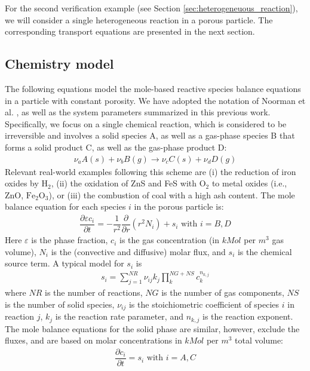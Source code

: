 \documentclass{particles2015}
\begin{document}
For the second verification example (see Section \ref{sec:heterogeneuous_reaction}), we will consider a single heterogeneous reaction in a porous particle. The corresponding transport equations are presented in the next section.

\subsection{Chemistry model}
The following equations model the mole-based reactive species balance equations in a particle with constant porosity. We have adopted the notation of Noorman et al. \cite{Noorman2011}, as well as the system parameters summarized in this previous work. Specifically, we focus on a single chemical reaction, which is considered to be irreversible and involves a solid species A, as well as a gas-phase species B that forms a solid product C, as well as the gas-phase product D:
\begin{align}
\nu_a A (s) + \nu_b B (g) \rightarrow \nu_c C(s) + \nu_d D(g)
\end{align}
Relevant real-world examples following this scheme are (i) the reduction of iron oxides by $\text{H}_2$, (ii) the oxidation of ZnS and FeS with $\text{O}_2$ to metal oxides (i.e., ZnO, $\text{Fe}_2\text{O}_3$), or (iii) the combustion of coal with a high ash content. The mole balance equation for each species $i$ in the porous particle is:
\begin{align}
\dfrac{\partial \varepsilon c_i}{\partial t} = - \dfrac{1}{r^2} \dfrac{\partial}{\partial r } (r^2 N_i) + s_i \text{ with } i = B, D
\end{align}
Here $\varepsilon$ is the phase fraction, $c_i$ is the gas concentration (in $kMol$ per $m^3$ gas volume), $N_i$ is the (convective and diffusive) molar flux, and $s_i$ is the chemical source term. A typical model for $s_i$ is
\begin{align}
s_i = \sum\limits_{j=1}^{NR} \nu_{ij} k_j \prod\limits_k^{NG+NS} c_k^{n_{k,j}}
\end{align} 
where $NR$ is the number of reactions, $NG$ is the number of gas components, $NS$ is the number of solid species, $\nu_{ij}$ is the stoichiometric coefficient of species $i$ in reaction $j$, $k_j$ is the reaction rate parameter, and $n_{k,j}$ is the reaction exponent. The mole balance equations for the solid phase are similar, however, exclude the fluxes, and are based on molar concentrations in $kMol$ per $m^3$ total volume:
\begin{align}
\dfrac{\partial c_i}{\partial t} = s_i \text{ with } i = A, C
\end{align}
\end{document}

